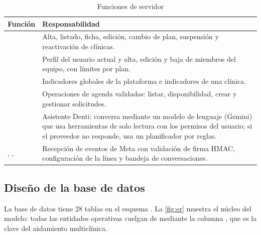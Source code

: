 \documentclass[11pt]{article}
\begin{document}
\begin{table}[H]
\centering\small
\caption{Funciones de servidor}\label{tab:funciones}
\begin{tabularx}{\linewidth}{@{}P{4.1cm}L@{}}
\toprule
\textbf{Función} & \textbf{Responsabilidad} \\
\midrule
{} & Alta, listado, ficha, edición, cambio de plan, suspensión y reactivación de clínicas. \\
 & Perfil del usuario actual y alta, edición y baja de miembros del equipo, con límites por plan. \\
 & Indicadores globales de la plataforma e indicadores de una clínica. \\
 & Operaciones de agenda validadas: listar, disponibilidad, crear y gestionar solicitudes. \\
 & Asistente Denti: conversa mediante un modelo de lenguaje (Gemini) que usa herramientas de solo lectura con los permisos del usuario; si el proveedor no responde, usa un planificador por reglas. \\
, ,  & Recepción de eventos de Meta con validación de firma HMAC, configuración de la línea y bandeja de conversaciones. \\
\bottomrule
\end{tabularx}
\end{table}

\subsection{Diseño de la base de datos}

La base de datos tiene 28 tablas en el esquema . La \cref{fig:er} muestra el núcleo del modelo: todas las entidades operativas cuelgan de  mediante la columna , que es la clave del aislamiento multiclínica.
\end{document}
